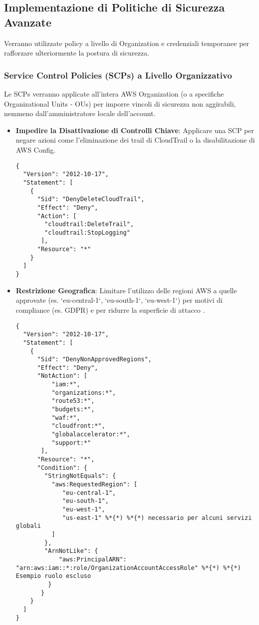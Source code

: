 \subsection{Implementazione di Politiche di Sicurezza Avanzate}

Verranno utilizzate policy a livello di Organization e credenziali temporanee per rafforzare ulteriormente la postura di sicurezza.

\subsubsection{Service Control Policies (SCPs) a Livello Organizzativo}

Le SCPs verranno applicate all'intera AWS Organization (o a specifiche Organizational Units - OUs) per imporre vincoli di sicurezza non aggirabili, nemmeno dall'amministratore locale dell'account.
\begin{itemize}
    \item \textbf{Impedire la Disattivazione di Controlli Chiave}: Applicare una SCP per negare azioni come l'eliminazione dei trail di CloudTrail o la disabilitazione di AWS Config.
    \begin{lstlisting}[style=json, caption={SCP per prevenire l'eliminazione di CloudTrail}, label=lst:scp-deny-cloudtrail-delete]
{
  "Version": "2012-10-17",
  "Statement": [
    {
      "Sid": "DenyDeleteCloudTrail",
      "Effect": "Deny",
      "Action": [
        "cloudtrail:DeleteTrail",
        "cloudtrail:StopLogging"
       ],
      "Resource": "*"
    }
  ]
}
    \end{lstlisting}
    \item \textbf{Restrizione Geografica}: Limitare l'utilizzo delle regioni AWS a quelle approvate (es. `eu-central-1`, `eu-south-1`, `eu-west-1`) per motivi di compliance (es. GDPR) e per ridurre la superficie di attacco \cite{awsbuilders:scps}.
    \begin{lstlisting}[style=json, caption={SCP per limitare le regioni utilizzabili}, label=lst:scp-region-restriction]
{
  "Version": "2012-10-17",
  "Statement": [
    {
      "Sid": "DenyNonApprovedRegions",
      "Effect": "Deny",
      "NotAction": [
          "iam:*",
          "organizations:*",
          "route53:*",
          "budgets:*",
          "waf:*",
          "cloudfront:*",
          "globalaccelerator:*",
          "support:*"
       ],
      "Resource": "*",
      "Condition": {
        "StringNotEquals": {
          "aws:RequestedRegion": [
             "eu-central-1",
             "eu-south-1",
             "eu-west-1",
             "us-east-1" %*{*) %*{*) necessario per alcuni servizi globali
          ]
        },
        "ArnNotLike": {
            "aws:PrincipalARN": "arn:aws:iam::*:role/OrganizationAccountAccessRole" %*{*) %*{*) Esempio ruolo escluso
         }
       }
    }
  ]
}
    \end{lstlisting}
\end{itemize}

